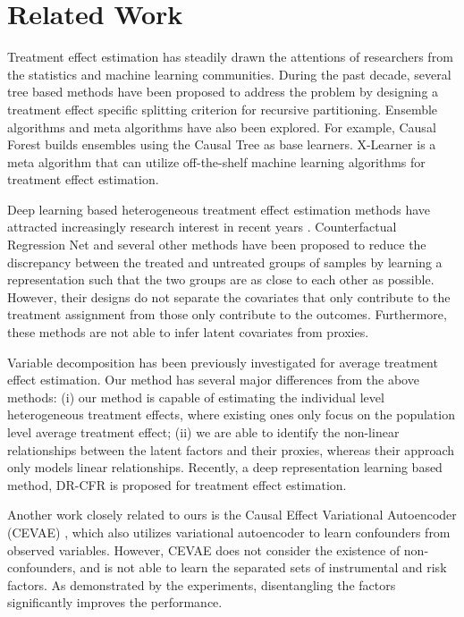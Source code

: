 \documentclass[letterpaper]{article} %
\begin{document}
\section*{Related Work}
Treatment effect estimation has steadily drawn the attentions of researchers from the statistics and machine learning communities. During the past decade,
several tree based methods \cite {Su2009,Athey2015,Zhang2017,Zhang2018} have been proposed to address the problem by designing a treatment effect specific splitting criterion for recursive partitioning.
Ensemble algorithms and meta algorithms \cite{Kuenzel2019,Wager2018} have also been explored. For example, Causal Forest\cite{Wager2018} builds ensembles using the Causal Tree \cite{Athey2015} as base learners. X-Learner \cite{Kuenzel2019} is a meta algorithm that can utilize off-the-shelf machine learning algorithms for treatment effect estimation.

Deep learning based heterogeneous treatment effect estimation methods have attracted increasingly research interest in recent years \cite{Shalit2016,Alaa2018,Louizos2017,Hassanpour2018,Yao2018_Twin,Yoon2018}.
Counterfactual Regression Net \cite{Shalit2016} and several other methods \cite{Yao2018_Twin,Hassanpour2018} have been proposed to reduce the discrepancy between the treated and untreated groups of samples by learning a representation such that the two groups are as close to each other as possible.
However, their designs do not separate the covariates that only contribute to the treatment assignment from those only contribute to the outcomes. Furthermore, these methods are not able to infer latent covariates from proxies.

Variable decomposition \cite{Kun2017,Haeggstroem2017} has been previously investigated for average treatment effect estimation.
Our method has several major differences from the above methods: (i) our method is capable of estimating the individual level heterogeneous treatment effects, where existing ones only focus on the population level average treatment effect; (ii) we are able to identify the non-linear relationships between the latent factors and their proxies, whereas their approach only models linear relationships. Recently, a deep representation learning based method, DR-CFR \cite{Hassanpour2020} is proposed for treatment effect estimation.

Another work closely related to ours is the Causal Effect Variational Autoencoder (CEVAE) \cite{Louizos2017}, which also utilizes variational autoencoder to learn confounders from observed variables. However, CEVAE does not consider the existence of non-confounders, and is not able to learn the separated sets of instrumental and risk factors.
As demonstrated by the experiments, disentangling the factors significantly improves the performance.
\end{document}
